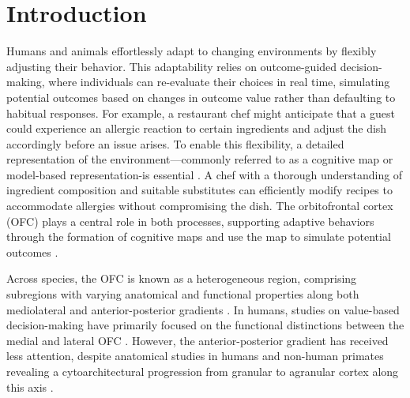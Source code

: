 \documentclass[lineno,sn-basic]{sn-jnl}%
\begin{document}
\maketitle

\section{Introduction}
\label{sec-intro}

Humans and animals effortlessly adapt to changing environments by flexibly adjusting their behavior. This adaptability relies on outcome-guided decision-making, where individuals can re-evaluate their choices in real time, simulating potential outcomes based on changes in outcome value \citep{RN644} rather than defaulting to habitual responses. For example, a restaurant chef might anticipate that a guest could experience an allergic reaction to certain ingredients and adjust the dish accordingly before an issue arises. To enable this flexibility,
a detailed representation of the environment---commonly referred to as a cognitive map or model-based representation-is essential \citep{behmulwhi18}. A chef with a thorough understanding of ingredient composition and suitable substitutes can efficiently modify recipes to accommodate allergies without compromising the dish. The orbitofrontal cortex (OFC) plays a central role in both processes, supporting adaptive behaviors through the formation of cognitive maps \citep{RN606,RN633} and use the map to simulate potential outcomes \citep{HowRey2020,RN15}. 

Across species, the OFC is known as a heterogeneous region, comprising subregions with varying anatomical and functional properties along both mediolateral and anterior-posterior gradients \citep{RN641,RN640,RN460,RN639,RN531,RN651,RN656,RN657,krirol04,neubert15}. In humans, studies on value-based decision-making have primarily focused on the functional distinctions between the medial and lateral OFC \citep{RN640,RN460,RN656}. However, the anterior-posterior gradient has received less attention, despite anatomical studies in humans and non-human primates revealing a cytoarchitectural progression from granular to agranular cortex along this axis \citep{RN641,RN640,RN657,krirol04,neubert15}.
\end{document}
